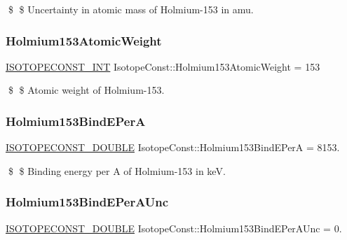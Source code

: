 \$ \$ Uncertainty in atomic mass of Holmium-\/153 in amu. \mbox{\label{group___isotope_const-_holmium-_ho153_ga7c0836314c2aeac1c1a87da70ba477e2}} 
\subsubsection{\texorpdfstring{Holmium153\+Atomic\+Weight}{Holmium153AtomicWeight}}
{\footnotesize\ttfamily \mbox{\hyperlink{group___isotope_const-_macros_ga5f18360b3e99483a35c32d789e62621c}{I\+S\+O\+T\+O\+P\+E\+C\+O\+N\+S\+T\+\_\+\+I\+NT}} Isotope\+Const\+::\+Holmium153\+Atomic\+Weight = 153}

\$ \$ Atomic weight of Holmium-\/153. \mbox{\label{group___isotope_const-_holmium-_ho153_ga6fc3c0ad1b8123e83e82e8e95c06de17}} 
\subsubsection{\texorpdfstring{Holmium153\+Bind\+E\+PerA}{Holmium153BindEPerA}}
{\footnotesize\ttfamily \mbox{\hyperlink{group___isotope_const-_macros_ga8f45a7272ce02c0b4c65c44636ed719a}{I\+S\+O\+T\+O\+P\+E\+C\+O\+N\+S\+T\+\_\+\+D\+O\+U\+B\+LE}} Isotope\+Const\+::\+Holmium153\+Bind\+E\+PerA = 8153.}

\$ \$ Binding energy per A of Holmium-\/153 in keV. \mbox{\label{group___isotope_const-_holmium-_ho153_gaf5a2c5a4b76bc914ad12cff7340840c2}} 
\subsubsection{\texorpdfstring{Holmium153\+Bind\+E\+Per\+A\+Unc}{Holmium153BindEPerAUnc}}
{\footnotesize\ttfamily \mbox{\hyperlink{group___isotope_const-_macros_ga8f45a7272ce02c0b4c65c44636ed719a}{I\+S\+O\+T\+O\+P\+E\+C\+O\+N\+S\+T\+\_\+\+D\+O\+U\+B\+LE}} Isotope\+Const\+::\+Holmium153\+Bind\+E\+Per\+A\+Unc = 0.}

